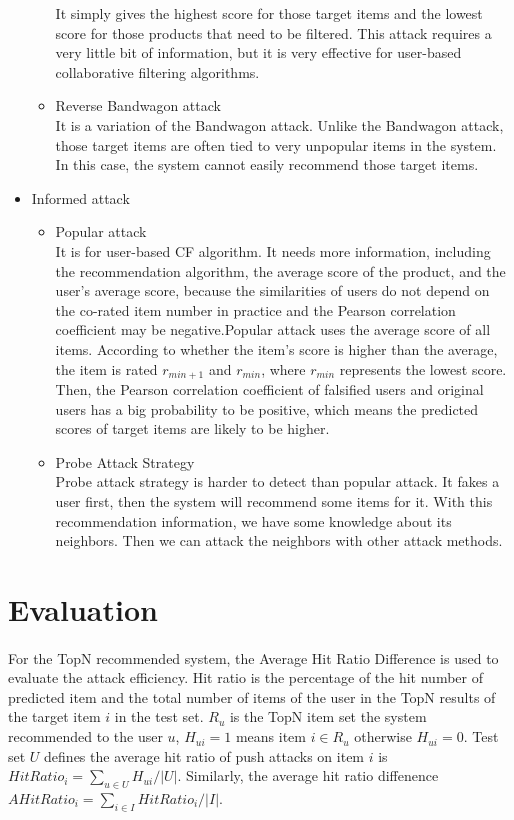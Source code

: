 \documentclass[a4paper, 12pt]{article}
\theoremstyle{definition}
\begin{document}
\begin{itemize}
\begin{itemize}
		It simply gives the highest score for those target items and the lowest score for those products that need to be filtered. This attack requires a very little bit of information, but it is very effective for user-based collaborative filtering algorithms.
		\item Reverse Bandwagon attack\\
		It is a variation of the Bandwagon attack. Unlike the Bandwagon attack, those target items are often tied to very unpopular items in the system. In this case, the system cannot easily recommend those target items.
	\end{itemize}
	\item Informed attack
	\begin{itemize}
		\item Popular attack\\
		It is for user-based CF algorithm. It needs more information, including the recommendation algorithm, the average score of the product, and the user's average score, because the similarities of users do not depend on the co-rated item number in practice and the Pearson correlation coefficient may be negative.Popular attack uses the average score of all items. According to whether the item's score is higher than the average, the item is rated $r_{min+1}$ and $r_{min}$, where $r_{min}$ represents the lowest score. Then, the Pearson correlation coefficient of falsified users and original users has a big probability to be positive, which means the predicted scores of target items are likely to be higher.
		\item Probe Attack Strategy\\
		Probe attack strategy is harder to detect than popular attack. It fakes a user first, then the system will recommend some items for it. With this recommendation information, we have some knowledge about its neighbors. Then we can attack the neighbors with other attack methods.
	\end{itemize}
\end{itemize}


\section{Evaluation}
\paragraph{}For the TopN recommended system, the  Average Hit Ratio Difference is used to evaluate the attack efficiency. Hit ratio is the percentage of the hit number of predicted item and the total number of items of the user in the TopN results of the target item $i$ in the test set. $R_u$ is the TopN item set the system recommended to the user $u$, $H_{ui}=1$ means item $i\in R_u$ otherwise $H_{ui}=0$. Test set $U$ defines the average hit ratio of push attacks on item $i$ is $HitRatio_i=\sum_{u\in U}H_{ui}/|U|$. Similarly, the average hit ratio diffenence $AHitRatio_i=\sum_{i\in I}HitRatio_i/|I|$.
\end{document}
